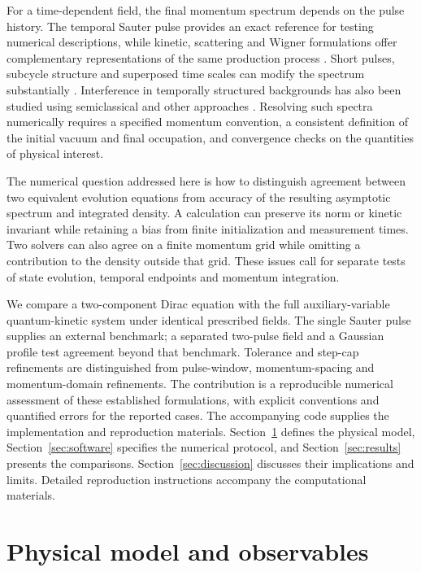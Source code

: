 \documentclass[anonymous]{iopjournal}
\begin{document}
For a time-dependent field, the final momentum spectrum depends on the pulse history. The temporal Sauter pulse provides an exact reference for testing numerical descriptions, while kinetic, scattering and Wigner formulations offer complementary representations of the same production process \cite{Dumlu2009,Hebenstreit2010,Fedotov2011,Huet2014}. Short pulses, subcycle structure and superposed time scales can modify the spectrum substantially \cite{Hebenstreit2008,Schutzhold2008,Hebenstreit2009}. Interference in temporally structured backgrounds has also been studied using semiclassical and other approaches \cite{DumluDunne2010,DumluDunne2011a,DumluDunne2011b,Akkermans2012,Li2014}. Resolving such spectra numerically requires a specified momentum convention, a consistent definition of the initial vacuum and final occupation, and convergence checks on the quantities of physical interest.

The numerical question addressed here is how to distinguish agreement between two equivalent evolution equations from accuracy of the resulting asymptotic spectrum and integrated density. A calculation can preserve its norm or kinetic invariant while retaining a bias from finite initialization and measurement times. Two solvers can also agree on a finite momentum grid while omitting a contribution to the density outside that grid. These issues call for separate tests of state evolution, temporal endpoints and momentum integration.

We compare a two-component Dirac equation with the full auxiliary-variable quantum-kinetic system under identical prescribed fields. The single Sauter pulse supplies an external benchmark; a separated two-pulse field and a Gaussian profile test agreement beyond that benchmark. Tolerance and step-cap refinements are distinguished from pulse-window, momentum-spacing and momentum-domain refinements. The contribution is a reproducible numerical assessment of these established formulations, with explicit conventions and quantified errors for the reported cases. The accompanying code supplies the implementation and reproduction materials. Section~\ref{sec:model} defines the physical model, Section~\ref{sec:software} specifies the numerical protocol, and Section~\ref{sec:results} presents the comparisons. Section~\ref{sec:discussion} discusses their implications and limits. Detailed reproduction instructions accompany the computational materials.

\section{Physical model and observables}
\label{sec:model}
\end{document}
